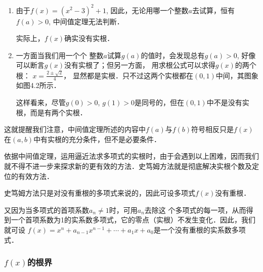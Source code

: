 \begin{solution}
\begin{enumerate}
    \item 由于$f(x)=(x^2-3)^2+1$, 因此，无论用哪一个整数$a$去试算，恒有$f(a)>0$, 中间值定理无法判断．
    
    实际上，$f(x)$确实没有实根．
    \item 一方面当我们用一个个
    整数$a$试算$g(a)$的值时，会发现总有$g(a)>0$, 好像可以断言$g(x)$没有实根了；但另一方面，
    用求根公式可以求得$g(x)$的两个根：
    $x=\frac{2\pm\sqrt{2}}{4}$，
    显然都是实根．只不过这两个实根都在$(0, 1)$中间，其图象如图4.2所示．

    这样看来，尽管$g(0)>0$, $g(1)>0$是同号的，但在$(0, 1)$中不是没有实根，而是有两个实根．
\end{enumerate}

\begin{figure}[htp]
    \centering
{}
    \caption{}
\end{figure}
\end{solution}

这就提醒我们注意，中间值定理所述的内容中$f(a)$与$f(b)$符号相反只是$f(x)$在$(a,b)$中有实根的充分条件，但不是必要条件．
    
    依据中间值定理，运用逼近法求多项式的实根时，由于会遇到以上困难，因而我们就不得不进一步来探求新的更有效的方法．史笃姆方法就是彻底解决实根个数及定位的有效方法．
    
    史笃姆方法只是对没有重根的多项式来说的，因此可设多项式$f(x)$没有重根．

又因为当多项式的首项系数$a_n\ne 1$时，可用$a_n$去除这
个多项式的每一项，从而得到一个首项系数为1的实系数多项式，它的零点（实根）不发生变化．因此，我们就可设
$f (x) =x^n+a_{n-1}x^{n-1}+\cdots +a_1x +a_0$是一个没有重根的实系数多项式．

\subsubsection{$f(x)$的根界}

